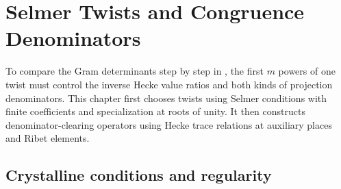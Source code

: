 \chapter{Selmer Twists and Congruence Denominators}
\label{chap:congruences}

\begin{chapterguide}
To compare the Gram determinants step by step in , the first $m$ powers of one twist must control the inverse Hecke value ratios and both kinds of projection denominators. This chapter first chooses twists using Selmer conditions with finite coefficients and specialization at roots of unity. It then constructs denominator-clearing operators using Hecke trace relations at auxiliary places and Ribet elements.
\end{chapterguide}

\section{Crystalline conditions and regularity}
\label{sec:c-regularity}

